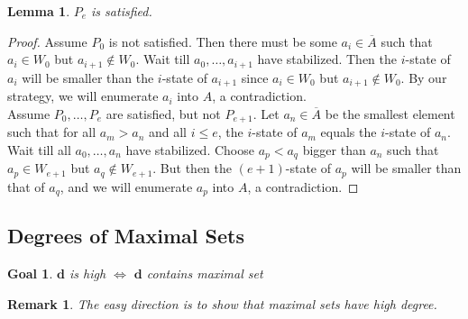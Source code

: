 \documentclass{article}
\newtheorem{lemma}{Lemma}[subsection]
\newtheorem{goal}{Goal}[subsection]
\newtheorem{remark}{Remark}[subsection]
\begin{document}
  \begin{lemma}
    $P_e$ is satisfied.
  \end{lemma}
  \begin{proof}
    Assume $P_0$ is not satisfied. Then there must be some
    $a_i\in\overline{A}$ such that $a_i\in W_0$ but $a_{i+1}\not\in W_0$.
    Wait till $a_0,\ldots,a_{i+1}$ have stabilized. Then
    the $i$-state of $a_i$ will be smaller than the $i$-state of $a_{i+1}$
    since $a_i\in W_0$ but $a_{i+1}\not\in W_0$. By our strategy, we will
    enumerate $a_i$ into $A$, a contradiction. \\

    Assume $P_0,\ldots,P_e$ are satisfied, but not $P_{e+1}$. Let
    $a_n\in\overline{A}$ be the smallest element such that for all
    $a_m>a_n$ and all $i\leq e$, the $i$-state of $a_m$ equals the
    $i$-state of $a_n$. Wait till all $a_0,\ldots,a_n$ have stabilized.
    Choose $a_p<a_q$ bigger than $a_n$ such that $a_p\in W_{e+1}$ but
    $a_q\not\in W_{e+1}$. But then the $(e+1)$-state of $a_p$ will be
    smaller than that of $a_q$, and we will enumerate $a_p$ into $A$, a
    contradiction.
  \end{proof}

\subsection{Degrees of Maximal Sets}
  \begin{goal}
    $\bm{d}$ is high $\Leftrightarrow$ $\bm{d}$ contains maximal set
  \end{goal}

  \begin{remark}
    The easy direction is to show that maximal sets have high degree. 
  \end{remark}
\end{document}
